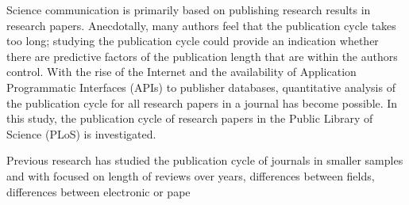 Science communication is primarily based on publishing research results in research papers. Anecdotally, many authors feel that the publication cycle takes too long; studying the publication cycle could provide an indication whether there are predictive factors of the publication length that are within the authors control. With the rise of the Internet and the availability of Application Programmatic Interfaces (APIs) to publisher databases, quantitative analysis of the publication cycle for all research papers in a journal has become possible. In this study, the publication cycle of research papers in the Public Library of Science (PLoS) is investigated.

Previous research has studied the publication cycle of journals in smaller samples and with focused on length of reviews over years, differences between fields, differences between electronic or pape